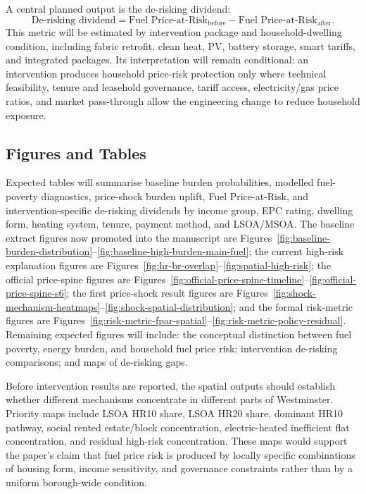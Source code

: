 A central planned output is the de-risking dividend:
\begin{equation}
\text{De-risking dividend} = \text{Fuel Price-at-Risk}_{\text{before}} - \text{Fuel Price-at-Risk}_{\text{after}}.
\end{equation}
This metric will be estimated by intervention package and household-dwelling condition, including fabric retrofit, clean heat, PV, battery storage, smart tariffs, and integrated packages. Its interpretation will remain conditional: an intervention produces household price-risk protection only where technical feasibility, tenure and leasehold governance, tariff access, electricity/gas price ratios, and market pass-through allow the engineering change to reduce household exposure.

\subsection{Figures and Tables}

Expected tables will summarise baseline burden probabilities, modelled fuel-poverty diagnostics, price-shock burden uplift, Fuel Price-at-Risk, and intervention-specific de-risking dividends by income group, EPC rating, dwelling form, heating system, tenure, payment method, and LSOA/MSOA. The baseline extract figures now promoted into the manuscript are Figures~\ref{fig:baseline-burden-distribution}--\ref{fig:baseline-high-burden-main-fuel}; the current high-risk explanation figures are Figures~\ref{fig:hr-br-overlap}--\ref{fig:spatial-high-risk}; the official price-spine figures are Figures~\ref{fig:official-price-spine-timeline}--\ref{fig:official-price-spine-s6}; the first price-shock result figures are Figures~\ref{fig:shock-mechanism-heatmaps}--\ref{fig:shock-spatial-distribution}; and the formal risk-metric figures are Figures~\ref{fig:risk-metric-fpar-spatial}--\ref{fig:risk-metric-policy-residual}. Remaining expected figures will include: the conceptual distinction between fuel poverty, energy burden, and household fuel price risk; intervention de-risking comparisons; and maps of de-risking gaps.

Before intervention results are reported, the spatial outputs should establish whether different mechanisms concentrate in different parts of Westminster. Priority maps include LSOA HR10 share, LSOA HR20 share, dominant HR10 pathway, social rented estate/block concentration, electric-heated inefficient flat concentration, and residual high-risk concentration. These maps would support the paper's claim that fuel price risk is produced by locally specific combinations of housing form, income sensitivity, and governance constraints rather than by a uniform borough-wide condition.

